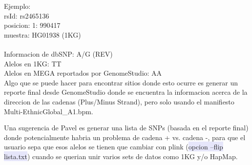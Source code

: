 \documentclass[11pt]{report}
\begin{document}
Ejemplo: \\
rsId: rs2465136\\
posicion: 1: 990417\\
muestra: HG01938 (1KG)\\
\\
Informacion de dbSNP: A/G (REV)\\
Alelos en 1KG: TT \\
Alelos en MEGA reportados por GenomeStudio: AA \\

Algo que se puede hacer para encontrar sitios donde esto ocurre es generar un reporte final desde GenomeStudio donde se encuentra la informacion acerca de la direccion de las cadenas (Plus/Minus Strand), pero solo usando el manifiesto Multi-EthnicGlobal\_A1.bpm. 

Una sugerencia de Pavel es generar una lista de SNPs (basada en el reporte final) donde potencialmente habria un problema de cadena + vs. cadena -, para que el usuario sepa que esos alelos se tienen que cambiar con plink (\colorbox{Lavender}{opcion --flip lista.txt}) cuando se querian unir varios sets de datos como 1KG y/o HapMap. 
\end{document}

